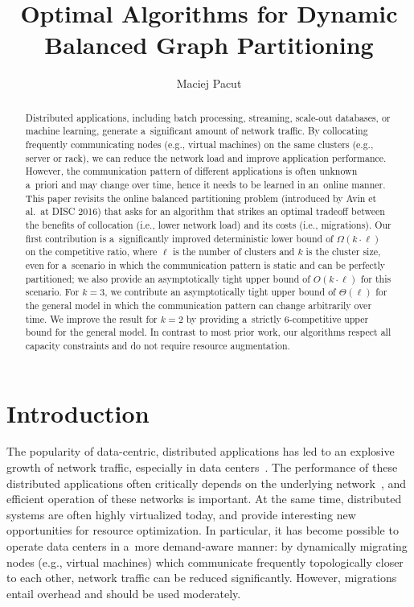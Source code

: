 \documentclass[a4paper,anonymous,USenglish]{lipics-v2019}
\title{Optimal Algorithms for Dynamic Balanced Graph Partitioning}
\author{Maciej Pacut}{maciej.pacut@univie.ac.at}{Faculty of Computer Science, University of Vienna,Austria}{0000-0002-6379-1490}{}
\begin{document}
\maketitle


\begin{abstract}
	Distributed   applications,  including  batch  processing, streaming, scale-out databases,
	or machine learning, generate a~significant amount of network traffic.
	By collocating frequently communicating nodes (e.g., virtual machines) on the same clusters (e.g., server or rack), we can reduce the network load and  improve application performance. 
	However, the communication pattern of different applications is often unknown a~priori and may change over time, hence it needs to be learned in an~online manner.
	This paper revisits the online 
	balanced partitioning problem 
	(introduced by Avin et al.~at DISC 2016)
	that asks for an algorithm that strikes
	an optimal tradeoff between the benefits
	of collocation (i.e., lower network load) 
	and its costs (i.e., migrations). 
	Our first contribution is a~significantly improved deterministic
	lower bound of $\Omega(k\cdot \ell)$ on the
	competitive ratio, where $\ell$ is the number
	of clusters and $k$ is the cluster size,
	even for a~scenario in which the communication
	pattern is static and can be perfectly partitioned;
	we also provide an asymptotically tight upper bound 
	of $O(k\cdot \ell)$ for this scenario.
	For $k=3$, we contribute an asymptotically tight upper bound
	of $\Theta(\ell)$
	for the general model in which the
	communication pattern can change arbitrarily over time.
	We improve the result for $k=2$ by providing a~strictly $6$-competitive upper bound for the general model.
	In contrast to most prior work, our algorithms respect all capacity constraints and do not require resource augmentation.
	
\end{abstract}




\section{Introduction}

The popularity of data-centric, distributed applications has led to an explosive growth of network traffic, especially in data centers~\cite{roy2015inside,singh2015jupiter}.
The performance of these distributed applications often critically depends on the underlying network~\cite{mogul2012we}, and efficient operation of these networks is important.
At the same time, distributed systems are often highly virtualized today, and provide interesting new opportunities for resource optimization.
In particular, it has become possible to operate data centers in a~more demand-aware manner: 
by dynamically migrating nodes (e.g., virtual machines) which communicate frequently topologically closer to each other, network traffic can be reduced significantly.  
However, migrations entail overhead and should be used moderately. 
\end{document}
